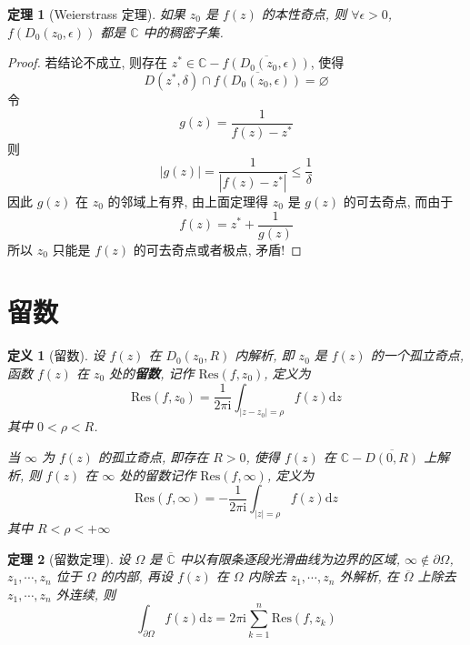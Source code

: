 \documentclass[12pt,a4paper]{article}
\newtheorem{thm}{定理}[section]  %
\newtheorem{definition}{定义}[section] %
\begin{document}
\begin{thm}[Weierstrass 定理]
    如果 $z_0$ 是 $f(z)$ 的本性奇点, 则 $\forall \epsilon > 0$, $f(D_0(z_0, \epsilon))$ 都是 $\mathbb{C}$ 中的稠密子集.
\end{thm}

\begin{proof}
    若结论不成立, 则存在 $z^* \in \mathbb{C} - \overline{f(D_0(z_0, \epsilon))}$, 使得
    \[ D(z^*, \delta) \cap \overline{f(D_0(z_0, \epsilon))}  = \varnothing \]
    令 \[g(z) = \frac{1}{f(z) - z^*}\] 则 \[|g(z)| = \frac{1}{|f(z) - z^*|} \leq \frac{1}{\delta}\] 
    因此 $g(z)$ 在 $z_0$ 的邻域上有界, 由上面定理得 $z_0$ 是 $g(z)$ 的可去奇点, 而由于
    \[f(z) = z^* + \frac{1}{g(z)}\] 所以 $z_0$ 只能是 $f(z)$ 的可去奇点或者极点, 矛盾!
\end{proof}

\section{留数}

\begin{definition}[留数]
    设 $f(z)$ 在 $D_0(z_0, R)$ 内解析, 即 $z_0$ 是 $f(z)$ 的一个孤立奇点, 函数 $f(z)$ 在 $z_0$ 处的\textbf{留数}, 记作 $\mathrm{Res}(f, z_0)$, 定义为
    \[\mathrm{Res}(f, z_0) = \frac{1}{2\pi \mathrm{i}} \int_{|z-z_0|=\rho} f(z) \mathrm{d} z\]
    其中 $0 < \rho < R$.

    当 $\infty$ 为 $f(z)$ 的孤立奇点, 即存在 $R>0$, 使得 $f(z)$ 在 $\mathbb{C}-\overline{D(0,R)}$ 上解析, 则 $f(z)$ 在 $\infty$ 处的留数记作 $\mathrm{Res}(f, \infty)$, 定义为
    \[\mathrm{Res}(f, \infty) = - \frac{1}{2\pi \mathrm{i}} \int_{|z|=\rho} f(z) \mathrm{d}z\]
    其中 $R < \rho < +\infty$
\end{definition}

\begin{thm}[留数定理]
    设 $\varOmega$ 是 $\overline{\mathbb{C}}$ 中以有限条逐段光滑曲线为边界的区域, $\infty \notin \partial \varOmega$, $z_1, \cdots, z_n$ 位于 $\varOmega$ 的内部, 
    再设 $f(z)$ 在 $\varOmega$ 内除去 $z_1, \cdots, z_n$ 外解析, 在 $\overline{\varOmega}$ 上除去 $z_1, \cdots, z_n$ 外连续, 则 
    \[\int_{\partial \varOmega} f(z) \mathrm{d}z = 2 \pi \mathrm{i} \sum\limits_{k=1}^n \mathrm{Res}(f, z_k)\]
\end{thm}
\end{document}
